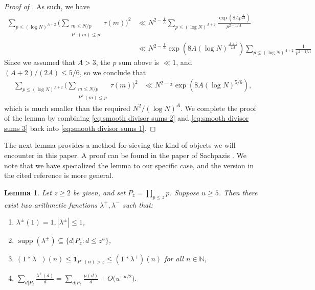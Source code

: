 \documentclass[12pt]{amsart}
\renewcommand{\le}{\leqslant}
\renewcommand{\leq}{\leqslant}
\renewcommand{\geq}{\geqslant}
\numberwithin{equation}{section}
\theoremstyle{plain}
\newtheorem{lem}[thm]{Lemma}
\theoremstyle{definition}
\newcommand{\N}{\mathbb{N}}
\newcommand{\supp}{\operatorname{supp}}
\begin{document}
\begin{proof}[Proof of ]
		As such, we have
		\begin{align*}
			\sum_{p \le (\log N)^{A+2}}\bigg(\sum_{\substack{m \leq N/p \\ P^+(m) \leq p}} \tau(m)\bigg)^2 &\ll N^{2-\frac{1}{A}}\sum_{p \le (\log N)^{A+2}}\frac{\exp(8Ap^{\frac{1}{2A}})}{p^{2-1/A}}\\ & \ll N^{2-\frac{1}{A}}\exp(8A(\log N)^{\frac{A+2}{2A}})\sum_{p  \le (\log N)^{A+2}}\frac{1}{p^{2-1/A}} 
		\end{align*}
		Since we assumed that $A > 3$, the $p$ sum above is $\ll 1$, and $(A+2)/(2A) \leq 5/6$, so we conclude that
		\begin{align}\label{eq:smooth divisor sums 3}
			\sum_{p \leq (\log N)^{A+2}}\bigg(\sum_{\substack{m \leq N/p \\ P^+(m) \leq p}} \tau(m)\bigg)^2 &\ll N^{2-\frac{1}{A}}\exp(8A(\log N)^{5/6}),
		\end{align}
		which is much smaller than the required $N^2/(\log N)^A$. We complete the proof of the lemma by combining \eqref{eq:smooth divisor sums 2} and \eqref{eq:smooth divisor sums 3} back into \eqref{eq:smooth divisor sums 1}.
	\end{proof}
	The next lemma provides a method for sieving the kind of objects we will encounter in this paper. A proof can be found in the paper of Sachpazis \cite[Lemma 3.8]{stelios}. We note that we have specialized the lemma to our specific case, and the version in the cited reference is more general.
	\begin{lem}\label{lem: stelios}
		Let $z \geq 2$ be given, and set $P_z =\prod_{p \leq z}p$. Suppose $u \geq 5$. Then there exist two arithmetic functions $\lambda^+,\lambda^-$ such that:
		\begin{enumerate}
			\item $\lambda^\pm(1) = 1, |\lambda^\pm| \leq 1$,
			\item $\supp (\lambda^\pm) \subseteq \{d| P_z : d \leq z^u\}$,
			\item $(1*\lambda^-)(n) \leq \bm{1}_{P^-(n) > z} \leq (1*\lambda^+)(n)$ for all $n \in \N$,
			\item $\sum_{d | P_z} \frac{\lambda^\pm(d)}{d} = \sum_{d | P_z} \frac{\mu(d)}{d} + O\big(u^{-u/2}\big).$ 
		\end{enumerate}
	\end{lem}
	
	
	
\end{document}
